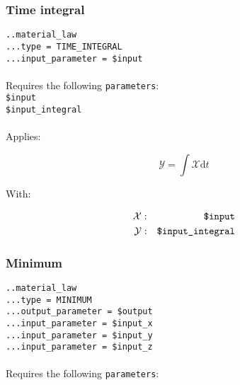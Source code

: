 \documentclass[10pt]{article}
\begin{document}
\subsubsection{Time integral}

\noindent \verb+..material_law+\\
\verb+...type = TIME_INTEGRAL+\\
\verb+...input_parameter = $input+

\paragraph{}Requires the following \verb+parameters+:\\

\noindent \verb+$input+\\
\verb+$input_integral+

\paragraph{}Applies:

\begin{equation}
	\mathcal{Y} = \int\limits \mathcal{X} \mathrm{d}t
\end{equation}

With:

\begin{eqnarray}
	\mathcal{X} & : & \verb+$input+ \notag \\
	\mathcal{Y} & : & \verb+$input_integral+ \notag
\end{eqnarray}

\subsubsection{Minimum}

\noindent \verb+..material_law+\\
\verb+...type = MINIMUM+\\
\verb+...output_parameter = $output+\\
\verb+...input_parameter = $input_x+\\
\verb+...input_parameter = $input_y+\\
\verb+...input_parameter = $input_z+

\paragraph{}Requires the following \verb+parameters+:\\
\end{document}
